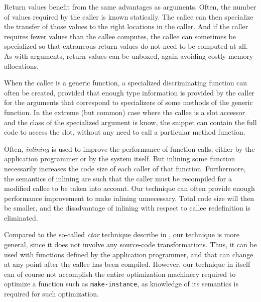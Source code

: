 Return values benefit from the same advantages as arguments.  Often,
the number of values required by the caller is known statically.  The
callee can then specialize the transfer of those values to the right
locations in the caller.  And if the caller requires fewer values than
the callee computes, the callee can sometimes be specialized so that
extraneous return values do not need to be computed at all.  As with
arguments, return values can be unboxed, again avoiding costly memory
allocations.

When the callee is a generic function, a specialized discriminating
function can often be created, provided that enough type information
is provided by the caller for the arguments that correspond to
specializers of some methods of the generic function.  In the extreme
(but common) case where the callee is a slot accessor and the class of
the specialized argument is know, the snippet can contain the full
code to access the slot, without any need to call a particular method
function.

Often, \emph{inlining} is used to improve the performance of function
calls, either by the application programmer or by the system itself.
But inlining some function necessarily increases the code size of each
caller of that function.  Furthermore, the semantics of inlining are
such that the caller must be recompiled for a modified callee to be
taken into account.  Our technique can often provide enough
performance improvement to make inlining unnecessary.  Total code size
will then be smaller, and the disadvantage of inlining with respect to
callee redefinition is eliminated.

Compared to the so-called \emph{ctor} technique describe in
, our technique is more general, since it
does not involve any source-code transformations.  Thus, it can be
used with functions defined by the application programmer, and that
can change at any point after the callee has been compiled.  However,
our technique in itself can of course not accomplish the entire
optimization machinery required to optimize a function such as
\texttt{make-instance}, as knowledge of its semantics is required for
such optimization.

